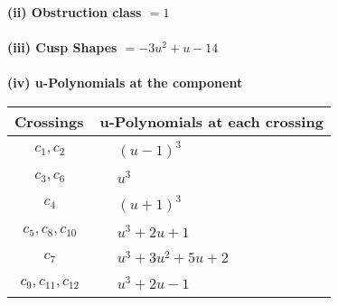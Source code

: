 \documentclass[1p]{elsarticle_modified}
\theoremstyle{definition}
\begin{document}
\flushleft \textbf{(ii) Obstruction class $= 1$}\\~\\
\flushleft \textbf{(iii) Cusp Shapes $= -3 u^2+u-14$}\\~\\
\newpage\renewcommand{\arraystretch}{1}
\flushleft \textbf{(iv) u-Polynomials at the component}\newline \\
\begin{tabular}{m{50pt}|m{274pt}}
Crossings & \hspace{64pt}u-Polynomials at each crossing \\
\hline $$\begin{aligned}c_{1},c_{2}\end{aligned}$$&$\begin{aligned}
&(u-1)^3
\end{aligned}$\\
\hline $$\begin{aligned}c_{3},c_{6}\end{aligned}$$&$\begin{aligned}
&u^3
\end{aligned}$\\
\hline $$\begin{aligned}c_{4}\end{aligned}$$&$\begin{aligned}
&(u+1)^3
\end{aligned}$\\
\hline $$\begin{aligned}c_{5},c_{8},c_{10}\end{aligned}$$&$\begin{aligned}
&u^3+2 u+1
\end{aligned}$\\
\hline $$\begin{aligned}c_{7}\end{aligned}$$&$\begin{aligned}
&u^3+3 u^2+5 u+2
\end{aligned}$\\
\hline $$\begin{aligned}c_{9},c_{11},c_{12}\end{aligned}$$&$\begin{aligned}
&u^3+2 u-1
\end{aligned}$\\
\hline
\end{tabular}\\~\\
\newpage\renewcommand{\arraystretch}{1}
\end{document}
